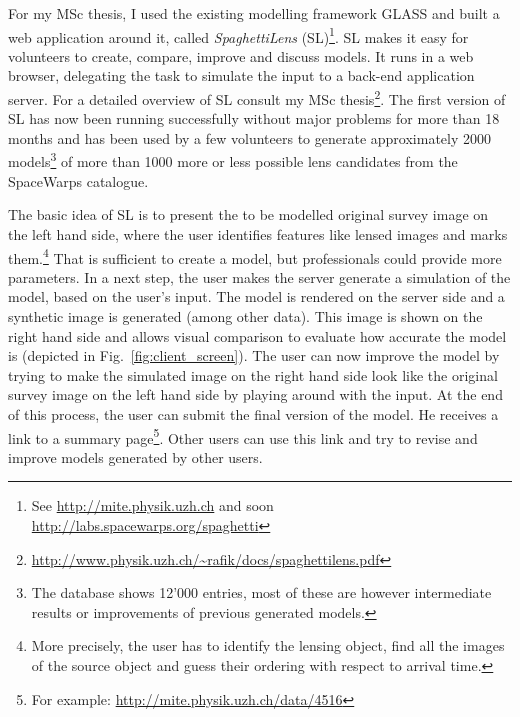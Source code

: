 \documentclass[11pt]{article}
\begin{document}
For my MSc thesis\cite{mscth}, I used the existing modelling framework GLASS\cite{glass2, glass} and built a web application around it, called \emph{SpaghettiLens} (SL)\footnote{See \url{http://mite.physik.uzh.ch} and soon \url{http://labs.spacewarps.org/spaghetti}}.
SL makes it easy for volunteers to create, compare, improve and discuss models.
It runs in a web browser, delegating the task to simulate the input to a back-end application server.
For a detailed overview of SL consult my MSc thesis\footnote{\url{http://www.physik.uzh.ch/~rafik/docs/spaghettilens.pdf}}.
The first version of SL has now been running successfully without major problems for more than 18 months and has been used by a few volunteers to generate approximately 2000 models\footnote{The database shows 12'000 entries, most of these are however intermediate results or improvements of previous generated models.} of more than 1000 more or less possible lens candidates from the SpaceWarps catalogue.


The basic idea of SL is to present the to be modelled original survey image on the left hand side, where the user identifies features like lensed images and marks them.\footnote{More precisely, the user has to identify the lensing object, find all the images of the source object and guess their ordering with respect to arrival time.}
That is sufficient to create a model, but professionals could provide more parameters.
In a next step, the user makes the server generate a simulation of the model, based on the user's input.
The model is rendered on the server side and a synthetic image is generated (among other data).
This image is shown on the right hand side and allows visual comparison to evaluate how accurate the model is (depicted in Fig.~\ref{fig:client_screen}).
The user can now improve the model by trying to make the simulated image on the right hand side look like the original survey image on the left hand side by playing around with the input.
At the end of this process, the user can submit the final version of the model.
He receives a link to a summary page\footnote{For example: \url{http://mite.physik.uzh.ch/data/4516}}.
Other users can use this link and try to revise and improve models generated by other users.
\end{document}
